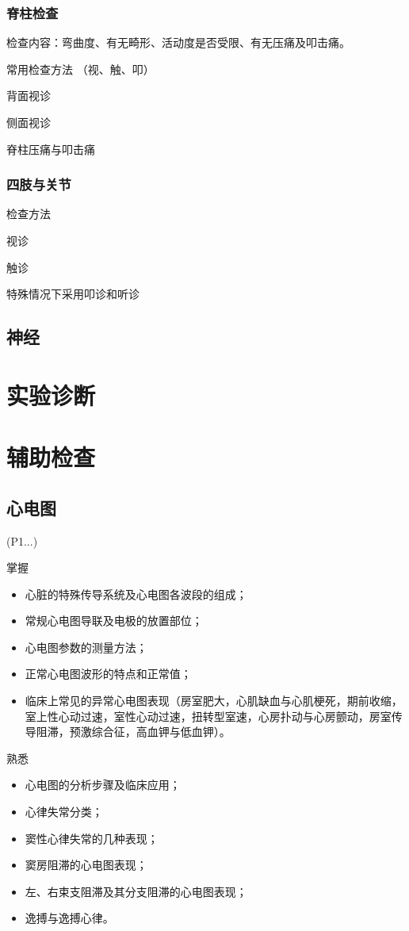 \documentclass[UTF8]{ctexbook}
\begin{document}
\section{脊柱检查}

检查内容：弯曲度、有无畸形、活动度是否受限、有无压痛及叩击痛。


常用检查方法
（视、触、叩）

背面视诊

侧面视诊

脊柱压痛与叩击痛

\section{四肢与关节}

检查方法

视诊

触诊

特殊情况下采用叩诊和听诊


\chapter{神经}

\part{实验诊断}
\part{辅助检查}
\chapter{心电图}(P1...)

掌握
\begin{itemize}
    \item 心脏的特殊传导系统及心电图各波段的组成；
    \item 常规心电图导联及电极的放置部位；
    \item 心电图参数的测量方法；
    \item 正常心电图波形的特点和正常值；
    \item 临床上常见的异常心电图表现（房室肥大，心肌缺血与心肌梗死，期前收缩，室上性心动过速，室性心动过速，扭转型室速，心房扑动与心房颤动，房室传导阻滞，预激综合征，高血钾与低血钾）。
\end{itemize}

熟悉
\begin{itemize}
    \item 心电图的分析步骤及临床应用；
    \item 心律失常分类；
    \item 窦性心律失常的几种表现；
    \item 窦房阻滞的心电图表现；
    \item 左、右束支阻滞及其分支阻滞的心电图表现；
    \item 逸搏与逸搏心律。
\end{itemize}
\end{document}
